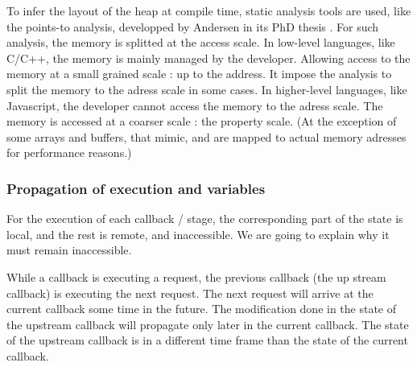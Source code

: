 

To infer the layout of the heap at compile time, static analysis tools are used, like the points-to analysis, developped by Andersen in its PhD thesis \cite{Andersen1994}.
For such analysis, the memory is splitted at the access scale.
In low-level languages, like C/C++, the memory is mainly managed by the developer. Allowing access to the memory at a small grained scale : up to the address.
It impose the analysis to split the memory to the adress scale in some cases.
In higher-level languages, like Javascript, the developer cannot access the memory to the adress scale.
The memory is accessed at a coarser scale : the property scale.
(At the exception of some arrays and buffers, that mimic, and are mapped to actual memory adresses for performance reasons.)

\subsubsection{Propagation of execution and variables}

For the execution of each callback / stage, the corresponding part of the state is local, and the rest is remote, and inaccessible.
We are going to explain why it must remain inaccessible.

While a callback is executing a request, the previous callback (the up stream callback) is executing the next request.
The next request will arrive at the current callback some time in the future.
The modification done in the state of the upstream callback will propagate only later in the current callback.
The state of the upstream callback is in a different time frame than the state of the current callback.

